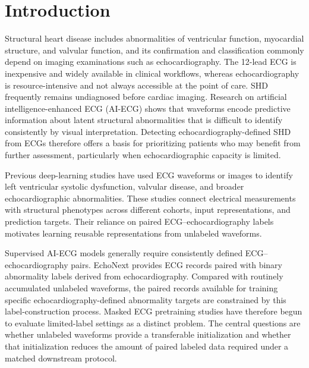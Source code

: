 \section{Introduction}
\label{sec:introduction}

Structural heart disease includes abnormalities of ventricular function, myocardial structure, and valvular function, and its confirmation and classification commonly depend on imaging examinations such as echocardiography\cite{lang2015chamber,otto2021valvular}. The 12-lead ECG is inexpensive and widely available in clinical workflows, whereas echocardiography is resource-intensive and not always accessible at the point of care. SHD frequently remains undiagnosed before cardiac imaging\cite{poterucha2025echonext}. Research on artificial intelligence-enhanced ECG (AI-ECG) shows that waveforms encode predictive information about latent structural abnormalities that is difficult to identify consistently by visual interpretation\cite{siontis2021aiecg}. Detecting echocardiography-defined SHD from ECGs therefore offers a basis for prioritizing patients who may benefit from further assessment, particularly when echocardiographic capacity is limited.

Previous deep-learning studies have used ECG waveforms or images to identify left ventricular systolic dysfunction, valvular disease, and broader echocardiographic abnormalities\cite{attia2019contractile,elias2022valvenet,ulloacerna2022rechommend,poterucha2025echonext,dhingra_present_shd_2025,aminorroaya_adapt_shd_2025}. These studies connect electrical measurements with structural phenotypes across different cohorts, input representations, and prediction targets\cite{avula2023ecgreview}. Their reliance on paired ECG--echocardiography labels motivates learning reusable representations from unlabeled waveforms.

Supervised AI-ECG models generally require consistently defined ECG--echocardiography pairs. EchoNext provides ECG records paired with binary abnormality labels derived from echocardiography\cite{elias2026echonextdata}. Compared with routinely accumulated unlabeled waveforms, the paired records available for training specific echocardiography-defined abnormality targets are constrained by this label-construction process. Masked ECG pretraining studies have therefore begun to evaluate limited-label settings as a distinct problem\cite{sawano_masked_lvsd_2024,ran_joint_masking_2024}. The central questions are whether unlabeled waveforms provide a transferable initialization and whether that initialization reduces the amount of paired labeled data required under a matched downstream protocol.

